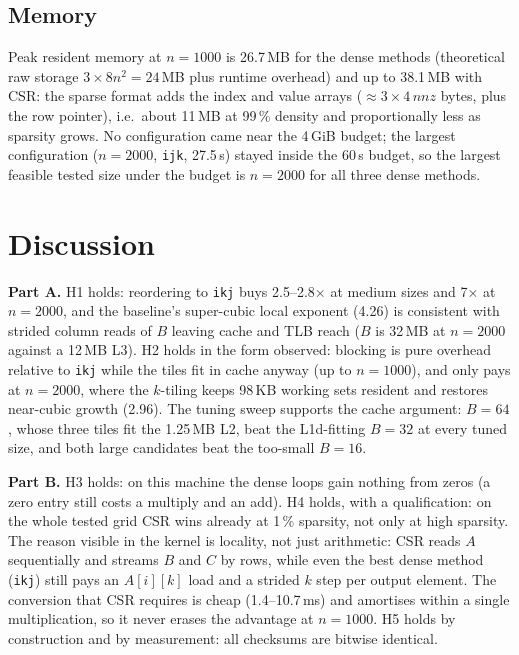 \documentclass[11pt,a4paper]{article}
\begin{document}
\subsection{Memory}

Peak resident memory at $n=1000$ is 26.7\,MB for the dense methods (theoretical
raw storage $3\times 8n^2 = 24$\,MB plus runtime overhead) and up to 38.1\,MB with
CSR: the sparse format adds the index and value arrays ($\approx 3 \times 4\,nnz$
bytes, plus the row pointer), i.e.\ about 11\,MB at 99\,\% density and
proportionally less as sparsity grows. No configuration came near the 4\,GiB
budget; the largest configuration ($n=2000$, \texttt{ijk}, 27.5\,s) stayed inside
the 60\,s budget, so the largest feasible tested size under the budget is
$n=2000$ for all three dense methods.

\section{Discussion}

\textbf{Part A.} H1 holds: reordering to \texttt{ikj} buys 2.5--2.8$\times$ at
medium sizes and 7$\times$ at $n=2000$, and the baseline's super-cubic local
exponent (4.26) is consistent with strided column reads of $B$ leaving cache and
TLB reach ($B$ is 32\,MB at $n=2000$ against a 12\,MB L3). H2 holds in the form
observed: blocking is pure overhead relative to \texttt{ikj} while the tiles fit
in cache anyway (up to $n=1000$), and only pays at $n=2000$, where the
$k$-tiling keeps 98\,KB working sets resident and restores near-cubic growth
(2.96). The tuning sweep supports the cache argument: $B=64$, whose three tiles
fit the 1.25\,MB L2, beat the L1d-fitting $B=32$ at every tuned size, and both
large candidates beat the too-small $B=16$.

\textbf{Part B.} H3 holds: on this machine the dense loops gain nothing from
zeros (a zero entry still costs a multiply and an add). H4 holds, with a
qualification: on the whole tested grid CSR wins already at 1\,\% sparsity, not
only at high sparsity. The reason visible in the kernel is locality, not just
arithmetic: CSR reads $A$ sequentially and streams $B$ and $C$ by rows, while even
the best dense method (\texttt{ikj}) still pays an $A[i][k]$ load and a strided
$k$ step per output element. The conversion that CSR requires is cheap
(1.4--10.7\,ms) and amortises within a single multiplication, so it never erases
the advantage at $n=1000$. H5 holds by construction and by measurement: all
checksums are bitwise identical.
\end{document}
